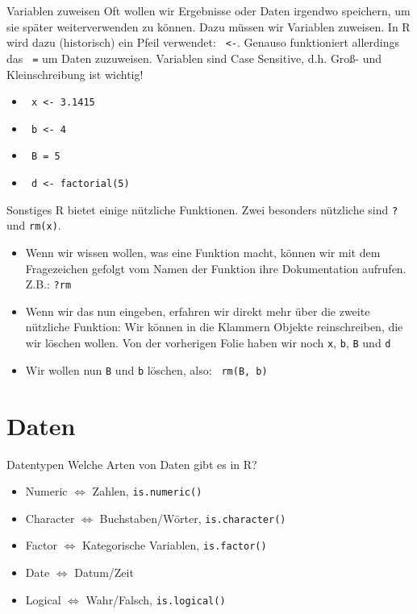 \documentclass[aspectratio = 169]{chariteBeamer}
\begin{document}
\begin{frame}[fragile]{Variablen zuweisen}
Oft wollen wir Ergebnisse oder Daten irgendwo speichern, um sie später weiterverwenden zu können. Dazu müssen wir Variablen zuweisen. In R wird dazu (historisch) ein Pfeil verwendet: \verb+ <-+. Genauso funktioniert allerdings das \verb+ =+ um Daten zuzuweisen. Variablen sind \glqq Case Sensitive\grqq{}, d.h. Groß- und Kleinschreibung ist wichtig!
\begin{itemize}
	\item \verb+ x <- 3.1415+
	\item \verb+ b <- 4+
	\item \verb+ B = 5+
	\item \verb+ d <- factorial(5)+
\end{itemize}
\end{frame}

\begin{frame}[fragile]{Sonstiges}
R bietet einige nützliche Funktionen. Zwei besonders nützliche sind \verb+?+ und \verb+rm(x)+.
\begin{itemize}
	\item Wenn wir wissen wollen, was eine Funktion macht, können wir mit dem Fragezeichen gefolgt vom Namen der Funktion ihre Dokumentation aufrufen. Z.B.: \verb+?rm+
	\item Wenn wir das nun eingeben, erfahren wir direkt mehr über die zweite nützliche Funktion: Wir können in die Klammern Objekte reinschreiben, die wir löschen wollen. Von der vorherigen Folie haben wir noch \verb+x+, \verb+b+, \verb+B+ und \verb+d+
	\item Wir wollen nun \verb+B+ und \verb+b+ löschen, also: \verb+ rm(B, b)+
\end{itemize}
\end{frame}

\section{Daten}
\begin{frame}[fragile]{Datentypen}
	Welche Arten von Daten gibt es in R?
	\begin{itemize}
		\item Numeric $\Leftrightarrow$ Zahlen, \verb+is.numeric()+
		\item Character $\Leftrightarrow$ Buchstaben/Wörter, \verb+is.character()+
		\item Factor $\Leftrightarrow$ Kategorische Variablen, \verb+is.factor()+
		\item Date $\Leftrightarrow$ Datum/Zeit
		\item Logical $\Leftrightarrow$ Wahr/Falsch, \verb+is.logical()+
	\end{itemize}
\end{frame}
\end{document}
